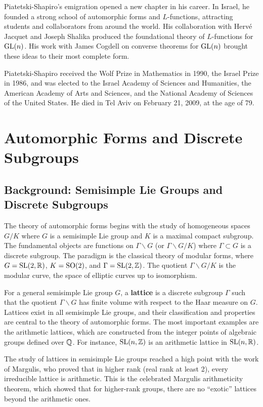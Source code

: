 Piatetski-Shapiro's emigration opened a new chapter in his career. In Israel, he founded a strong school of automorphic forms and \(L\)-functions, attracting students and collaborators from around the world. His collaboration with Herv\'{e} Jacquet and Joseph Shalika produced the foundational theory of \(L\)-functions for \(\operatorname{GL}(n)\). His work with James Cogdell on converse theorems for \(\operatorname{GL}(n)\) brought these ideas to their most complete form.

Piatetski-Shapiro received the Wolf Prize in Mathematics in 1990, the Israel Prize in 1986, and was elected to the Israel Academy of Sciences and Humanities, the American Academy of Arts and Sciences, and the National Academy of Sciences of the United States. He died in Tel Aviv on February 21, 2009, at the age of 79.

\section{Automorphic Forms and Discrete Subgroups}

\subsection{Background: Semisimple Lie Groups and Discrete Subgroups}

The theory of automorphic forms begins with the study of homogeneous spaces \(G/K\) where \(G\) is a semisimple Lie group and \(K\) is a maximal compact subgroup. The fundamental objects are functions on \(\Gamma \backslash G\) (or \(\Gamma \backslash G/K\)) where \(\Gamma \subset G\) is a discrete subgroup. The paradigm is the classical theory of modular forms, where \(G = \operatorname{SL}(2,\mathbb{R})\), \(K = \operatorname{SO}(2)\), and \(\Gamma = \operatorname{SL}(2,\mathbb{Z})\). The quotient \(\Gamma \backslash G/K\) is the modular curve, the space of elliptic curves up to isomorphism.

For a general semisimple Lie group \(G\), a \textbf{lattice} is a discrete subgroup \(\Gamma\) such that the quotient \(\Gamma \backslash G\) has finite volume with respect to the Haar measure on \(G\). Lattices exist in all semisimple Lie groups, and their classification and properties are central to the theory of automorphic forms. The most important examples are the arithmetic lattices, which are constructed from the integer points of algebraic groups defined over \(\mathbb{Q}\). For instance, \(\operatorname{SL}(n,\mathbb{Z})\) is an arithmetic lattice in \(\operatorname{SL}(n,\mathbb{R})\).

The study of lattices in semisimple Lie groups reached a high point with the work of Margulis, who proved that in higher rank (real rank at least 2), every irreducible lattice is arithmetic. This is the celebrated Margulis arithmeticity theorem, which showed that for higher-rank groups, there are no ``exotic'' lattices beyond the arithmetic ones.

